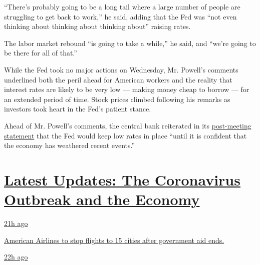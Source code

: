 ``There's probably going to be a long tail where a large number of
people are struggling to get back to work,'' he said, adding that the
Fed was ``not even thinking about thinking about thinking about''
raising rates.

The labor market rebound ``is going to take a while,'' he said, and
``we're going to be there for all of that.''

While the Fed took no major actions on Wednesday, Mr. Powell's comments
underlined both the peril ahead for American workers and the reality
that interest rates are likely to be very low --- making money cheap to
borrow --- for an extended period of time. Stock prices climbed
following his remarks as investors took heart in the Fed's patient
stance.

Ahead of Mr. Powell's comments, the central bank reiterated in its
\href{https://www.federalreserve.gov/newsevents/pressreleases/monetary20200729a.htm}{post-meeting
statement} that the Fed would keep low rates in place ``until it is
confident that the economy has weathered recent events.''

\hypertarget{latest-updates-the-coronavirus-outbreak-and-the-economy}{%
\section{\texorpdfstring{\href{https://www.nytimes3xbfgragh.onion/live/2020/08/20/business/stock-market-today-coronavirus?action=click\&pgtype=Article\&state=default\&region=MAIN_CONTENT_1\&context=storylines_live_updates}{Latest
Updates: The Coronavirus Outbreak and the
Economy}}{Latest Updates: The Coronavirus Outbreak and the Economy}}\label{latest-updates-the-coronavirus-outbreak-and-the-economy}}

\href{https://www.nytimes3xbfgragh.onion/live/2020/08/20/business/stock-market-today-coronavirus?action=click\&pgtype=Article\&state=default\&region=MAIN_CONTENT_1\&context=storylines_live_updates\#american-airlines-to-stop-flights-to-15-cities-after-government-aid-ends}{21h
ago}

\href{https://www.nytimes3xbfgragh.onion/live/2020/08/20/business/stock-market-today-coronavirus?action=click\&pgtype=Article\&state=default\&region=MAIN_CONTENT_1\&context=storylines_live_updates\#american-airlines-to-stop-flights-to-15-cities-after-government-aid-ends}{American
Airlines to stop flights to 15 cities after government aid ends.}

\href{https://www.nytimes3xbfgragh.onion/live/2020/08/20/business/stock-market-today-coronavirus?action=click\&pgtype=Article\&state=default\&region=MAIN_CONTENT_1\&context=storylines_live_updates\#without-school-plays-and-assemblies-a-technicians-livelihood-withers}{22h
ago}

